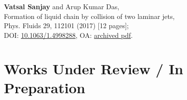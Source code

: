 \documentclass[10pt,a4paper,colorlinks,linkcolor=blue,urlcolor=blue,citecolor=blue]{moderncv}
\begin{document}
\begin{enumerate}[leftmargin=1.5em,label=\textbf{[\arabic*]}]
	\item \textbf{Vatsal Sanjay} and Arup Kumar Das,\\
	Formation of liquid chain by collision of two laminar jets,\\
	Phys. Fluids 29, 112101  (2017) [12 pages];\\
	\faLock\hspace{0.2em}DOI: \href{https://doi.org/10.1063/1.4998288}{10.1063/1.4998288}, \faFile\hspace{0.2em}OA: \href{https://tinyurl.com/27sd7lgo}{archived pdf}.

\end{enumerate}

\section{Works Under Review / In Preparation}
\end{document}
